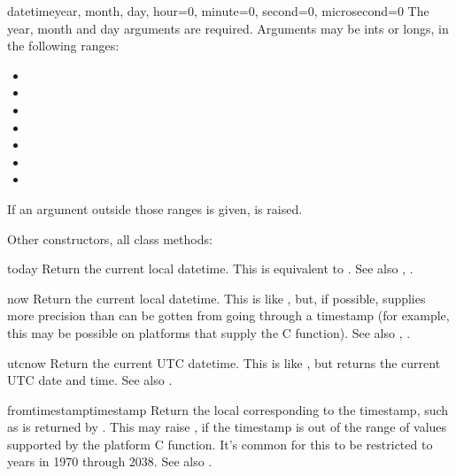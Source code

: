 \begin{classdesc}{datetime}{year, month, day,
                            hour=0, minute=0, second=0, microsecond=0}
  The year, month and day arguments are required.  Arguments may be
  ints or longs, in the following ranges:

  \begin{itemize}
    \item {}
    \item {}
    \item {}
    \item {}
    \item {}
    \item {}
    \item {}
  \end{itemize}

  If an argument outside those ranges is given, 
  is raised.
\end{classdesc}

Other constructors, all class methods:

\begin{methoddesc}{today}{}
  Return the current local datetime.  This is equivalent to
  .
  See also , .
\end{methoddesc}

\begin{methoddesc}{now}{}
  Return the current local datetime.  This is like ,
  but, if possible, supplies more precision than can be gotten from
  going through a  timestamp (for example,
  this may be possible on platforms that supply the C
   function).
  See also , .
\end{methoddesc}

\begin{methoddesc}{utcnow}{}
  Return the current UTC datetime.  This is like , but
  returns the current UTC date and time.
  See also .
\end{methoddesc}

\begin{methoddesc}{fromtimestamp}{timestamp}
  Return the local  corresponding to the \POSIX{}
  timestamp, such as is returned by .  This
  may raise , if the timestamp is out of the
  range of values supported by the platform C
   function.  It's common for this to be
  restricted to years in 1970 through 2038.
  See also .
\end{methoddesc}

